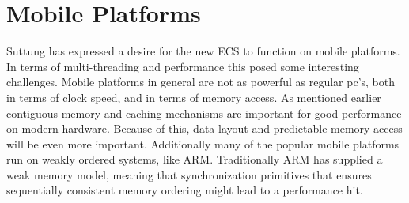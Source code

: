 \section{Mobile Platforms}
Suttung has expressed a desire for the new ECS to function on mobile platforms.
In terms of multi-threading and performance this posed some interesting challenges.
Mobile platforms in general are not as powerful as regular pc's, both in terms of clock speed, and in terms of memory access.
As mentioned earlier  contiguous memory and caching mechanisms are important for good performance on modern hardware.
Because of this, data layout and predictable memory access will be even more important. \cite[10:38]{andrei_alexandrescu_quick_code_quickly}
Additionally many of the popular mobile platforms run on weakly ordered systems, like ARM. \cite{phreshing_weak_vs_strong_memory_models}
Traditionally ARM has supplied a weak memory model, meaning that synchronization primitives that ensures sequentially consistent memory ordering
might lead to a performance hit. 
